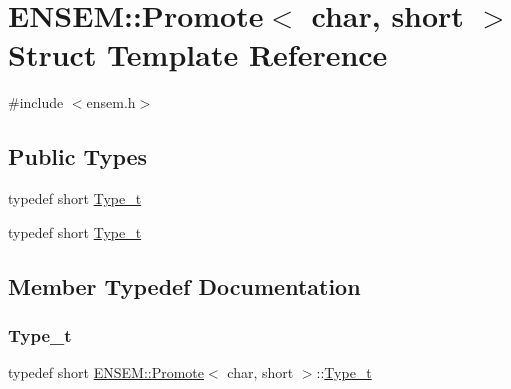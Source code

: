 \hypertarget{structENSEM_1_1Promote_3_01char_00_01short_01_4}{}\section{E\+N\+S\+EM\+:\+:Promote$<$ char, short $>$ Struct Template Reference}
\label{structENSEM_1_1Promote_3_01char_00_01short_01_4}


{\ttfamily \#include $<$ensem.\+h$>$}

\subsection*{Public Types}
\begin{DoxyCompactItemize}
\item 
typedef short \mbox{\hyperlink{structENSEM_1_1Promote_3_01char_00_01short_01_4_a4f4c8da33427bfc6c1ff6d15e8639105}{Type\+\_\+t}}
\item 
typedef short \mbox{\hyperlink{structENSEM_1_1Promote_3_01char_00_01short_01_4_a4f4c8da33427bfc6c1ff6d15e8639105}{Type\+\_\+t}}
\end{DoxyCompactItemize}


\subsection{Member Typedef Documentation}
\mbox{\label{structENSEM_1_1Promote_3_01char_00_01short_01_4_a4f4c8da33427bfc6c1ff6d15e8639105}} 
\subsubsection{\texorpdfstring{Type\_t}{Type\_t}\hspace{0.1cm}{\footnotesize\ttfamily [1/2]}}
{\footnotesize\ttfamily typedef short \mbox{\hyperlink{structENSEM_1_1Promote}{E\+N\+S\+E\+M\+::\+Promote}}$<$ char, short $>$\+::\mbox{\hyperlink{structENSEM_1_1Promote_3_01char_00_01short_01_4_a4f4c8da33427bfc6c1ff6d15e8639105}{Type\+\_\+t}}}

\mbox{\label{structENSEM_1_1Promote_3_01char_00_01short_01_4_a4f4c8da33427bfc6c1ff6d15e8639105}} 
